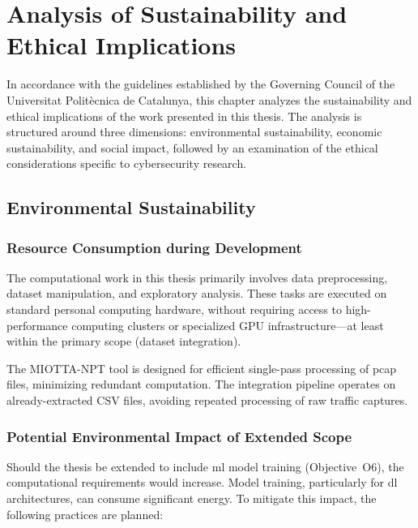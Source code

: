 \chapter{Analysis of Sustainability and Ethical Implications}
\label{ch:sustainability}

In accordance with the guidelines established by the Governing Council of the Universitat Politècnica de Catalunya, this chapter analyzes the sustainability and ethical implications of the work presented in this thesis. The analysis is structured around three dimensions: environmental sustainability, economic sustainability, and social impact, followed by an examination of the ethical considerations specific to cybersecurity research.

\section{Environmental Sustainability}
\label{sec:environmental}

\subsection{Resource Consumption during Development}

The computational work in this thesis primarily involves data preprocessing, dataset manipulation, and exploratory analysis. These tasks are executed on standard personal computing hardware, without requiring access to high-performance computing clusters or specialized GPU infrastructure---at least within the primary scope (dataset integration).

The MIOTTA-NPT tool is designed for efficient single-pass processing of \gls{pcap} files, minimizing redundant computation. The integration pipeline operates on already-extracted CSV files, avoiding repeated processing of raw traffic captures.

\subsection{Potential Environmental Impact of Extended Scope}

Should the thesis be extended to include \gls{ml} model training (Objective~O6), the computational requirements would increase. Model training, particularly for \gls{dl} architectures, can consume significant energy. To mitigate this impact, the following practices are planned:

